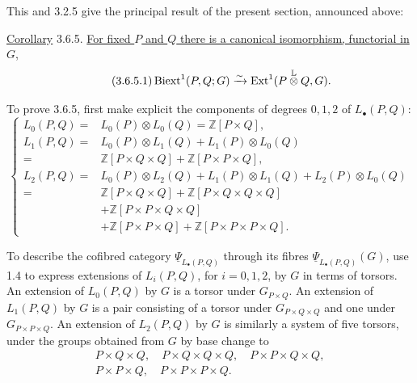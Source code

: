 This and 3.2.5 give the principal result of the present section,
announced above:

\underline{Corollary} 3.6.5. \underline{For fixed $P$ and $Q$ there
is a canonical isomorphism, functorial in $G$,}
\begin{equation}\tag{3.6.5.1}
 \operatorname{Biext}^1(P,Q;G)
 \xrightarrow{\sim}
 \operatorname{Ext}^1(P\mathbin{\overset{\mathbb L}{\otimes}}Q,G).
\end{equation}

To prove 3.6.5, first make explicit the components of degrees
$0,1,2$ of $L_\bullet(P,Q)$:
\begin{equation}\tag{3.6.6}
\left\{
\begin{aligned}
 L_0(P,Q)
  ={}&L_0(P)\otimes L_0(Q)
     =\mathbb Z[P\times Q],\\
 L_1(P,Q)
  ={}&L_0(P)\otimes L_1(Q)+L_1(P)\otimes L_0(Q)\\
  ={}&\mathbb Z[P\times Q\times Q]
     +\mathbb Z[P\times P\times Q],\\
 L_2(P,Q)
  ={}&L_0(P)\otimes L_2(Q)+L_1(P)\otimes L_1(Q)
     +L_2(P)\otimes L_0(Q)\\
  ={}&\mathbb Z[P\times Q\times Q]
     +\mathbb Z[P\times Q\times Q\times Q]\\
   &+\mathbb Z[P\times P\times Q\times Q]\\
   &+\mathbb Z[P\times P\times Q]
     +\mathbb Z[P\times P\times P\times Q].
\end{aligned}
\right.
\end{equation}

To describe the cofibred category
$\underline\Psi_{L_\bullet(P,Q)}$ through its fibres
$\underline\Psi_{L_\bullet(P,Q)}(G)$, use 1.4 to express extensions
of $L_i(P,Q)$, for $i=0,1,2$, by $G$ in terms of torsors.  An
extension of $L_0(P,Q)$ by $G$ is a torsor under $G_{P\times Q}$.
An extension of $L_1(P,Q)$ by $G$ is a pair consisting of a torsor
under $G_{P\times Q\times Q}$ and one under
$G_{P\times P\times Q}$.  An extension of $L_2(P,Q)$ by $G$ is
similarly a system of five torsors, under the groups obtained from
$G$ by base change to
\[
\begin{gathered}
 P\times Q\times Q,\quad
 P\times Q\times Q\times Q,\quad
 P\times P\times Q\times Q,\\
 P\times P\times Q,\quad
 P\times P\times P\times Q.
\end{gathered}
\]

